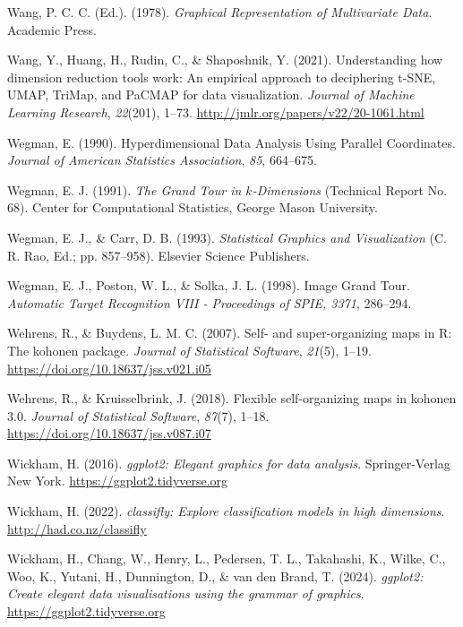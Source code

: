 \documentclass[
  letterpaper,
]{krantz}
\newlength{\cslhangindent}
\newenvironment{CSLReferences}[2] %
 {\begin{list}{}{%
  \setlength{\itemindent}{0pt}
  \setlength{\leftmargin}{0pt}
  \setlength{\parsep}{0pt}
  \ifodd #1
   \setlength{\leftmargin}{\cslhangindent}
   \setlength{\itemindent}{-1\cslhangindent}
  \fi
  \setlength{\itemsep}{#2\baselineskip}}}
 {\end{list}}
\begin{document}
\begin{CSLReferences}{1}{0}
Wang, P. C. C. (Ed.). (1978). \emph{{G}raphical {R}epresentation of
{M}ultivariate {D}ata}. Academic Press.

Wang, Y., Huang, H., Rudin, C., \& Shaposhnik, Y. (2021). Understanding
how dimension reduction tools work: An empirical approach to deciphering
t-SNE, UMAP, TriMap, and PaCMAP for data visualization. \emph{Journal of
Machine Learning Research}, \emph{22}(201), 1--73.
\url{http://jmlr.org/papers/v22/20-1061.html}

Wegman, E. (1990). {H}yperdimensional {D}ata {A}nalysis {U}sing
{P}arallel {C}oordinates. \emph{Journal of American Statistics
Association}, \emph{85}, 664--675.

Wegman, E. J. (1991). \emph{The {G}rand {T}our in \(k\)-{D}imensions}
(Technical Report No. 68). Center for Computational Statistics, George
Mason University.

Wegman, E. J., \& Carr, D. B. (1993). \emph{{S}tatistical {G}raphics and
{V}isualization} (C. R. Rao, Ed.; pp. 857--958). Elsevier Science
Publishers.

Wegman, E. J., Poston, W. L., \& Solka, J. L. (1998). Image {G}rand
{T}our. \emph{Automatic Target Recognition VIII - Proceedings of SPIE,
3371}, 286--294.

Wehrens, R., \& Buydens, L. M. C. (2007). Self- and super-organizing
maps in {R}: The {kohonen} package. \emph{Journal of Statistical
Software}, \emph{21}(5), 1--19.
\url{https://doi.org/10.18637/jss.v021.i05}

Wehrens, R., \& Kruisselbrink, J. (2018). Flexible self-organizing maps
in {kohonen} 3.0. \emph{Journal of Statistical Software}, \emph{87}(7),
1--18. \url{https://doi.org/10.18637/jss.v087.i07}

Wickham, H. (2016). \emph{{ggplot2}: Elegant graphics for data
analysis}. Springer-Verlag New York. \url{https://ggplot2.tidyverse.org}

Wickham, H. (2022). \emph{{classifly}: Explore classification models in
high dimensions}. \url{http://had.co.nz/classifly}

Wickham, H., Chang, W., Henry, L., Pedersen, T. L., Takahashi, K.,
Wilke, C., Woo, K., Yutani, H., Dunnington, D., \& van den Brand, T.
(2024). \emph{{ggplot2}: Create elegant data visualisations using the
grammar of graphics}. \url{https://ggplot2.tidyverse.org}


\end{CSLReferences}
\end{document}
